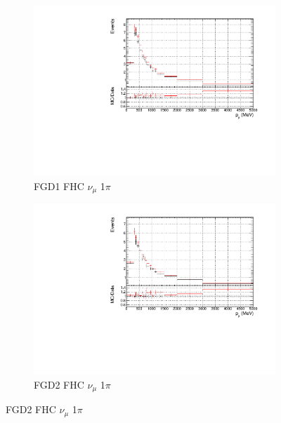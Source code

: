 \begin{figure}[!htbp]
\begin{subfigure}{0.49\textwidth}
  \centering
  \includegraphics[width=\textwidth]{figs/prioronly1D_p_FGD1_numuCC_1pi}
  \caption{FGD1 FHC $\nu_{\mu}$ 1$\pi$}
\end{subfigure}
\begin{subfigure}{0.49\textwidth}
  \centering
  \includegraphics[width=\textwidth]{figs/prioronly1D_p_FGD2_numuCC_1pi}
  \caption{FGD2 FHC $\nu_{\mu}$ 1$\pi$}
\end{subfigure}


\end{figure}

